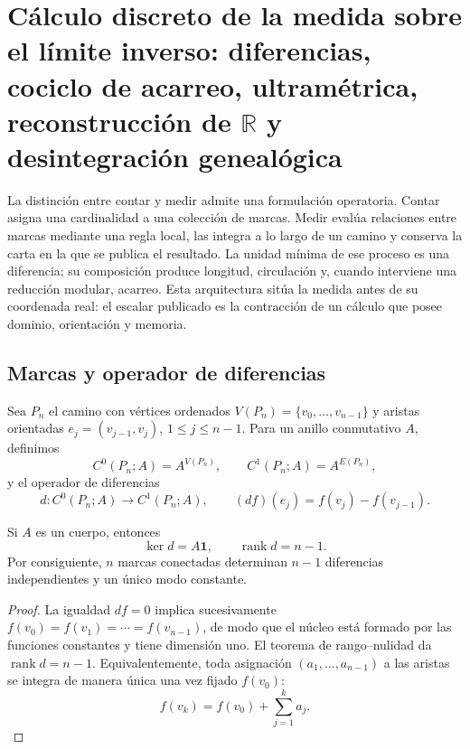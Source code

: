 \section{Cálculo discreto de la medida sobre el límite inverso: diferencias, cociclo de acarreo, ultramétrica, reconstrucción de \texorpdfstring{\(\mathbb R\)}{R} y desintegración genealógica}
\label{sec:complejo-discreto-medida-rev2}

La distinción entre contar y medir admite una formulación operatoria. Contar
asigna una cardinalidad a una colección de marcas. Medir evalúa relaciones
entre marcas mediante una regla local, las integra a lo largo de un camino y
conserva la carta en la que se publica el resultado. La unidad mínima de ese
proceso es una diferencia; su composición produce longitud, circulación y,
cuando interviene una reducción modular, acarreo. Esta arquitectura sitúa la
medida antes de su coordenada real: el escalar publicado es la contracción de
un cálculo que posee dominio, orientación y memoria.

\subsection{Marcas y operador de diferencias}

Sea \(P_n\) el camino con vértices ordenados
\(V(P_n)=\{v_0,\ldots,v_{n-1}\}\) y aristas orientadas
\(e_j=(v_{j-1},v_j)\), \(1\leq j\leq n-1\). Para un anillo conmutativo
\(A\), definimos
\[
 C^0(P_n;A)=A^{V(P_n)},
 \qquad
 C^1(P_n;A)=A^{E(P_n)},
\]
y el operador de diferencias
\begin{equation}
 d:C^0(P_n;A)\longrightarrow C^1(P_n;A),
 \qquad
 (df)(e_j)=f(v_j)-f(v_{j-1}).
 \label{eq:diferencia-cero-uno-rev2}
\end{equation}

\begin{theorem}
\label{thm:rango-diferencias-camino-rev2}
Si \(A\) es un cuerpo, entonces
\[
 \ker d=A\mathbf 1,
 \qquad
 \operatorname{rank}d=n-1.
\]
Por consiguiente, \(n\) marcas conectadas determinan \(n-1\) diferencias
independientes y un único modo constante.
\end{theorem}

\begin{proof}
La igualdad \(df=0\) implica sucesivamente
\(f(v_0)=f(v_1)=\cdots=f(v_{n-1})\), de modo que el núcleo está formado por
las funciones constantes y tiene dimensión uno. El teorema de
rango--nulidad da \(\operatorname{rank}d=n-1\). Equivalentemente, toda
asignación \((a_1,\ldots,a_{n-1})\) a las aristas se integra de manera única
una vez fijado \(f(v_0)\):
\[
 f(v_k)=f(v_0)+\sum_{j=1}^{k}a_j.
\]
\end{proof}

